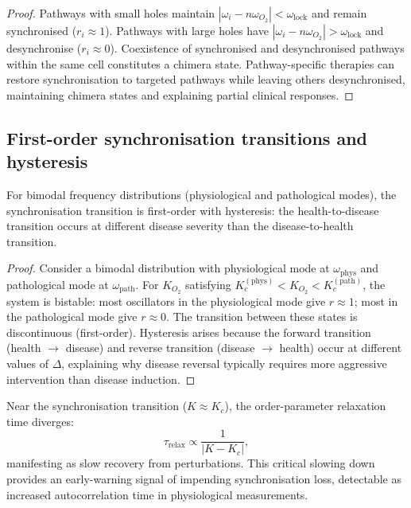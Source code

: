 \begin{proof}
Pathways with small holes maintain $|\omega_i - n\omega_{O_2}|
< \omega_{\mathrm{lock}}$ and remain synchronised ($r_i \approx 1$).
Pathways with large holes have $|\omega_i - n\omega_{O_2}|
> \omega_{\mathrm{lock}}$ and desynchronise ($r_i \approx 0$).  Coexistence
of synchronised and desynchronised pathways within the same cell constitutes
a chimera state.  Pathway-specific therapies can restore synchronisation to
targeted pathways while leaving others desynchronised, maintaining chimera
states and explaining partial clinical responses.
\end{proof}

\subsection{First-order synchronisation transitions and hysteresis}

\begin{theorem}
\label{thm:ch07-first-order}
For bimodal frequency distributions (physiological and pathological modes),
the synchronisation transition is first-order with hysteresis: the
health-to-disease transition occurs at different disease severity than the
disease-to-health transition.
\end{theorem}

\begin{proof}
Consider a bimodal distribution with physiological mode at
$\omega_{\mathrm{phys}}$ and pathological mode at $\omega_{\mathrm{path}}$.
For $K_{O_2}$ satisfying $K_c^{(\mathrm{phys})} < K_{O_2} <
K_c^{(\mathrm{path})}$, the system is bistable: most oscillators in the
physiological mode give $r \approx 1$; most in the pathological mode give
$r \approx 0$.  The transition between these states is discontinuous
(first-order).  Hysteresis arises because the forward transition
(health $\to$ disease) and reverse transition (disease $\to$ health) occur
at different values of $\Delta$, explaining why disease reversal typically
requires more aggressive intervention than disease induction.
\end{proof}

\begin{corollary}
\label{cor:ch07-critical-slowing}
Near the synchronisation transition ($K \approx K_c$), the order-parameter
relaxation time diverges:
\begin{equation}
  \tau_{\mathrm{relax}} \propto \frac{1}{|K - K_c|},
  \label{eq:ch07-critical-slowing}
\end{equation}
manifesting as slow recovery from perturbations.  This critical slowing
down provides an early-warning signal of impending synchronisation loss,
detectable as increased autocorrelation time in physiological measurements.
\end{corollary}

